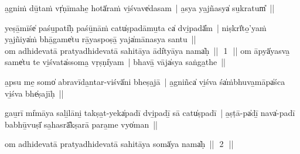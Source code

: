 \documentclass[parskip, DIV=14]{scrartcl}
\begin{document}
{%

a̱gniṁ dū̱taṁ vṛ̍ṇīmahe̱ hotā̍raṁ vi̱śvave̍dasam~| 
a̱sya ya̱jñasya̍ su̱kratum̎~||


yeṣā̱mīśe̍ paśu̱pati̍ḥ paśū̱nāṁ catu̍ṣpadāmu̱ta ca̍ dvi̱padā̎m~| 
niṣkrī̍to̱’yaṁ ya̱jñiya̍ṁ bhā̱game̍tu rā̱yaspoṣā̱ yaja̍mānasya santu~||\\


om adhidevatā pratyadhidevatā sahitāya ādi̍tyāya॒ nama̍ḥ~||~\,1\,~||
\vspace{0.5cm}
\newpage
om āpyā̍yasva̱ same̍tu te vi̱śvata̍ssoma̱ vṛṣṇi̍yam~| bhavā̱ vāja̍sya saṅga̱the~||


a̱psu me̱ somo̍ abravīda̱ntar-viśvā̍ni bheṣa̱jā~| 
a̱gniñca̍ vi̱śva śa̍ṁbhuva̱māpa̍śca vi̱śva bhe̍ṣajīḥ~||


gau̱rī mi̍māya sali̱lāni̱ takṣa̱t-yeka̍padī dvi̱padī̱ sā catu̍ṣpadī~| 
a̱ṣṭā-pa̍dī̱ nava̍-padī babhū̱vuṣī̍ sa̱hasrā̎kṣarā para̱me vyo̍man~||


om adhidevatā pratyadhidevatā sahitāya somā̍ya॒ nama̍ḥ~||~\,2\,~||
\vspace{0.5cm}

}
\end{document}
